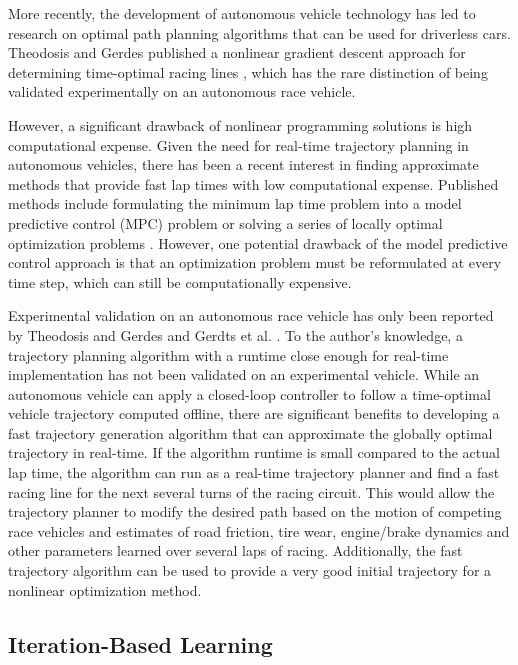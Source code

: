 More recently, the development of autonomous vehicle technology has led to research on optimal path
 planning algorithms that can be used for driverless cars. Theodosis and Gerdes published a nonlinear gradient descent approach for determining time-optimal racing lines
 \cite{theodosis}, which has the rare distinction of being validated experimentally on an autonomous race vehicle. 
  
 However, a significant drawback of nonlinear programming solutions is high computational expense. Given the need for real-time trajectory planning in
 autonomous vehicles, there has been a recent interest in finding approximate methods that provide fast lap times with low computational expense. Published methods include formulating the minimum lap time problem
 into a model predictive control (MPC) problem \cite{morari}\cite{timings} or solving a series of locally optimal optimization
 problems \cite{gerdts}\cite{velly}. However, one potential 
 drawback of the model predictive control approach is that an optimization
 problem must be reformulated at every time step, which can still be computationally expensive.
 
 Experimental validation on an 
 autonomous race vehicle has only been reported by Theodosis and Gerdes \cite{theodosis} and Gerdts et al. \cite{gerdts}. 
 To the author's knowledge, a trajectory planning algorithm with a runtime close enough for real-time implementation has not been validated on an experimental vehicle.
 While an autonomous vehicle can apply a closed-loop controller to follow a time-optimal vehicle trajectory computed offline,
 there are  significant benefits to developing a fast trajectory generation algorithm that can approximate the globally optimal trajectory in real-time. 
 If the algorithm runtime is small compared to the actual lap time, the algorithm can run as a real-time trajectory planner and find a fast racing line 
 for the next several turns of the racing circuit. This would allow the trajectory planner to modify the desired path based on the motion of competing race vehicles and 
 estimates of road friction, tire wear, engine/brake dynamics and other parameters learned over several laps of racing. Additionally, the fast trajectory algorithm can
 be used to provide a very good initial trajectory for a nonlinear optimization method.  

\subsection{Iteration-Based Learning}

